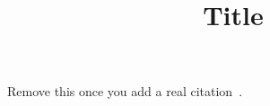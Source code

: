 \documentclass[10pt,conference]{IEEEtran}
\begin{document}
\title{Title}

\author{
\IEEEauthorblockA{}
}

\maketitle




%
Remove this once you add a real citation~\cite{DumbBib}.






\end{document}
